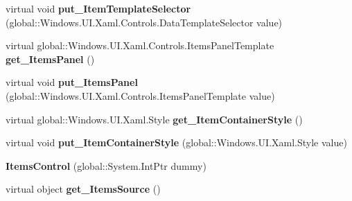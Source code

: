 \begin{DoxyCompactItemize}
\item 
\mbox{\label{class_windows_1_1_u_i_1_1_xaml_1_1_controls_1_1_items_control_aa9c0c0db76f9d77b78c08b022e500e90}} 
virtual void {\bfseries put\+\_\+\+Item\+Template\+Selector} (global\+::\+Windows.\+U\+I.\+Xaml.\+Controls.\+Data\+Template\+Selector value)
\item 
\mbox{\label{class_windows_1_1_u_i_1_1_xaml_1_1_controls_1_1_items_control_a54332e55a6fbe6987c21c07fe342a9e2}} 
virtual global\+::\+Windows.\+U\+I.\+Xaml.\+Controls.\+Items\+Panel\+Template {\bfseries get\+\_\+\+Items\+Panel} ()
\item 
\mbox{\label{class_windows_1_1_u_i_1_1_xaml_1_1_controls_1_1_items_control_affd7b155eec7e46ac2c935a6634d6d21}} 
virtual void {\bfseries put\+\_\+\+Items\+Panel} (global\+::\+Windows.\+U\+I.\+Xaml.\+Controls.\+Items\+Panel\+Template value)
\item 
\mbox{\label{class_windows_1_1_u_i_1_1_xaml_1_1_controls_1_1_items_control_ac8ecf557d2e90d25785dc40f5d1e3069}} 
virtual global\+::\+Windows.\+U\+I.\+Xaml.\+Style {\bfseries get\+\_\+\+Item\+Container\+Style} ()
\item 
\mbox{\label{class_windows_1_1_u_i_1_1_xaml_1_1_controls_1_1_items_control_a22e6b11c11e2306e3c13c1294b698d47}} 
virtual void {\bfseries put\+\_\+\+Item\+Container\+Style} (global\+::\+Windows.\+U\+I.\+Xaml.\+Style value)
\item 
\mbox{\label{class_windows_1_1_u_i_1_1_xaml_1_1_controls_1_1_items_control_a2a23be568a479e115892800d6b88b77a}} 
{\bfseries Items\+Control} (global\+::\+System.\+Int\+Ptr dummy)
\item 
\mbox{\label{class_windows_1_1_u_i_1_1_xaml_1_1_controls_1_1_items_control_ada6978b5b6da9e42647e7bbae2efa4d9}} 
virtual object {\bfseries get\+\_\+\+Items\+Source} ()
\item 

\end{DoxyCompactItemize}

